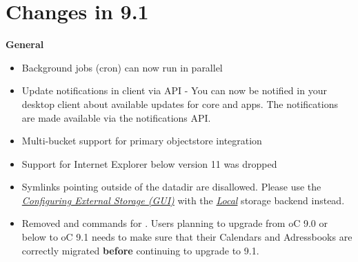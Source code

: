\documentclass[letterpaper,10pt,english]{sphinxmanual}
\begin{document}
\section{Changes in 9.1}
\label{release_notes:changes-in-9-1}
\textbf{General}
\begin{itemize}
\item {} 
Background jobs (cron) can now run in parallel

\item {} 
Update notifications in client via API - You can now be notified in your desktop client
about available updates for core and apps. The notifications are made available via the
notifications API.

\item {} 
Multi-bucket support for primary objectstore integration

\item {} 
Support for Internet Explorer below version 11 was dropped

\item {} 
Symlinks pointing outside of the datadir are disallowed. Please use the {\hyperref[configuration_files/external_storage_configuration_gui::doc]{\emph{\emph{Configuring External Storage (GUI)}}}}
with the {\hyperref[configuration_files/external_storage/local::doc]{\emph{\emph{Local}}}} storage backend instead.

\item {} 
Removed  and  commands for .
Users planning to upgrade from oC 9.0 or below to oC 9.1 needs to make sure that their
Calendars and Adressbooks are correctly migrated \textbf{before} continuing to upgrade to 9.1.

\end{itemize}
\end{document}
